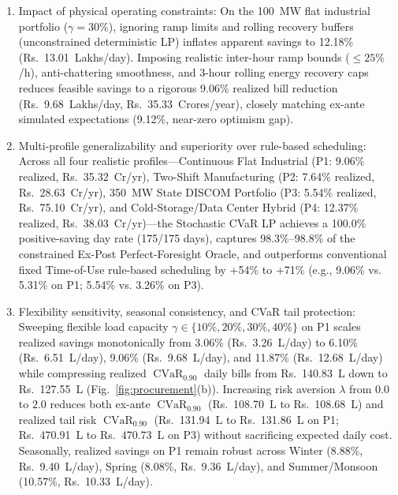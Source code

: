 \documentclass[runningheads,a4paper]{llncs}
\begin{document}
\begin{enumerate}
    \item Impact of physical operating constraints: On the 100~MW flat industrial portfolio ($\gamma = 30\%$), ignoring ramp limits and rolling recovery buffers (unconstrained deterministic LP) inflates apparent savings to 12.18\% (Rs.~13.01~Lakhs/day). Imposing realistic inter-hour ramp bounds ($\le 25\%$/h), anti-chattering smoothness, and 3-hour rolling energy recovery caps reduces feasible savings to a rigorous 9.06\% realized bill reduction (Rs.~9.68~Lakhs/day, Rs.~35.33~Crores/year), closely matching ex-ante simulated expectations (9.12\%, near-zero optimism gap).
    \item Multi-profile generalizability and superiority over rule-based scheduling: Across all four realistic profiles---Continuous Flat Industrial (P1: 9.06\% realized, Rs.~35.32~Cr/yr), Two-Shift Manufacturing (P2: 7.64\% realized, Rs.~28.63~Cr/yr), 350~MW State DISCOM Portfolio (P3: 5.54\% realized, Rs.~75.10~Cr/yr), and Cold-Storage/Data Center Hybrid (P4: 12.37\% realized, Rs.~38.03~Cr/yr)---the Stochastic CVaR LP achieves a 100.0\% positive-saving day rate (175/175 days), captures 98.3\%--98.8\% of the constrained Ex-Post Perfect-Foresight Oracle, and outperforms conventional fixed Time-of-Use rule-based scheduling by +54\% to +71\% (e.g., 9.06\% vs. 5.31\% on P1; 5.54\% vs. 3.26\% on P3).
    \item Flexibility sensitivity, seasonal consistency, and CVaR tail protection: Sweeping flexible load capacity $\gamma \in \{10\%, 20\%, 30\%, 40\%\}$ on P1 scales realized savings monotonically from 3.06\% (Rs.~3.26~L/day) to 6.10\% (Rs.~6.51~L/day), 9.06\% (Rs.~9.68~L/day), and 11.87\% (Rs.~12.68~L/day) while compressing realized $\operatorname{CVaR}_{0.90}$ daily bills from Rs.~140.83~L down to Rs.~127.55~L (Fig.~\ref{fig:procurement}(b)). Increasing risk aversion $\lambda$ from $0.0$ to $2.0$ reduces both ex-ante $\operatorname{CVaR}_{0.90}$ (Rs.~108.70~L to Rs.~108.68~L) and realized tail risk $\operatorname{CVaR}_{0.90}$ (Rs.~131.94~L to Rs.~131.86~L on P1; Rs.~470.91~L to Rs.~470.73~L on P3) without sacrificing expected daily cost. Seasonally, realized savings on P1 remain robust across Winter (8.88\%, Rs.~9.40~L/day), Spring (8.08\%, Rs.~9.36~L/day), and Summer/Monsoon (10.57\%, Rs.~10.33~L/day).
\end{enumerate}
\end{document}
